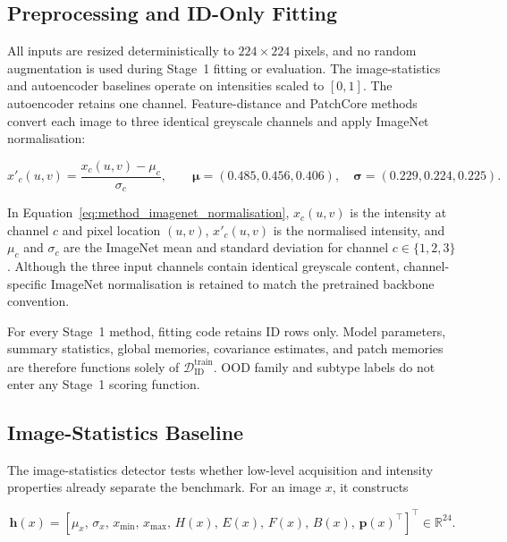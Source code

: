 \documentclass[fleqn,12pt]{olplainarticle}
\begin{document}
\subsection{Preprocessing and ID-Only Fitting}
\label{subsec:shared_preprocessing}

All inputs are resized deterministically to $224\times224$ pixels, and no
random augmentation is used during Stage~1 fitting or evaluation. The
image-statistics and autoencoder baselines operate on intensities scaled to
$[0,1]$. The autoencoder retains one channel. Feature-distance and PatchCore
methods convert each image to three identical greyscale channels and apply
ImageNet normalisation:

\begin{equation}
    x'_{c}(u,v)
    =
    \frac{x_{c}(u,v)-\mu_c}{\sigma_c},
    \qquad
    \boldsymbol{\mu}=(0.485,0.456,0.406),
    \quad
    \boldsymbol{\sigma}=(0.229,0.224,0.225).
    \label{eq:method_imagenet_normalisation}
\end{equation}

In Equation~\ref{eq:method_imagenet_normalisation},
$x_c(u,v)$ is the intensity at channel $c$ and pixel location $(u,v)$,
$x'_c(u,v)$ is the normalised intensity, and $\mu_c$ and $\sigma_c$ are the
ImageNet mean and standard deviation for channel $c\in\{1,2,3\}$. Although the
three input channels contain identical greyscale content, channel-specific
ImageNet normalisation is retained to match the pretrained backbone
convention.

For every Stage~1 method, fitting code retains ID rows only. Model parameters,
summary statistics, global memories, covariance estimates, and patch memories
are therefore functions solely of
$\mathcal{D}_{\mathrm{ID}}^{\mathrm{train}}$. OOD family and subtype labels do
not enter any Stage~1 scoring function.

\subsection{Image-Statistics Baseline}
\label{subsec:image_statistics_method}

The image-statistics detector tests whether low-level acquisition and intensity
properties already separate the benchmark. For an image $x$, it constructs

\begin{equation}
    \mathbf{h}(x)
    =
    \left[
        \mu_x,\,
        \sigma_x,\,
        x_{\min},\,
        x_{\max},\,
        H(x),\,
        E(x),\,
        F(x),\,
        B(x),\,
        \mathbf{p}(x)^{\top}
    \right]^{\top}
    \in\mathbb{R}^{24}.
    \label{eq:method_statistics_vector}
\end{equation}
\end{document}
